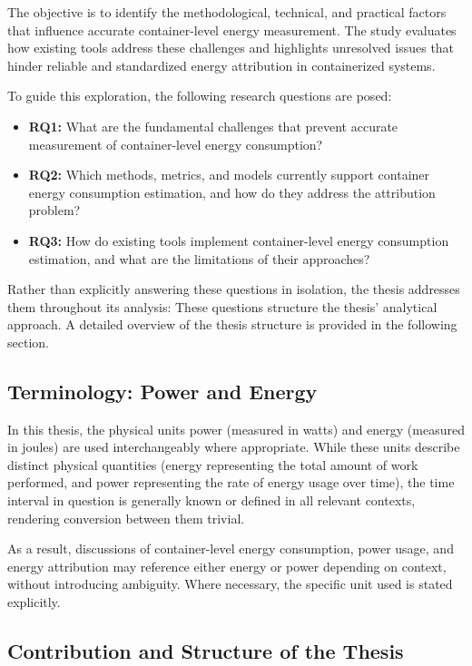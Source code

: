 The objective is to identify the methodological, technical, and practical factors that influence accurate container-level energy measurement. The study evaluates how existing tools address these challenges and highlights unresolved issues that hinder reliable and standardized energy attribution in containerized systems.

To guide this exploration, the following research questions are posed:

\begin{itemize}
\item \textbf{RQ1:} What are the fundamental challenges that prevent accurate measurement of container-level energy consumption?
\item \textbf{RQ2:} Which methods, metrics, and models currently support container energy consumption estimation, and how do they address the attribution problem?
\item \textbf{RQ3:} How do existing tools implement container-level energy consumption estimation, and what are the limitations of their approaches?
\end{itemize}

Rather than explicitly answering these questions in isolation, the thesis addresses them throughout its analysis: These questions structure the thesis’ analytical approach. A detailed overview of the thesis structure is provided in the following section.

\subsection{Terminology: Power and Energy}

In this thesis, the physical units power (measured in watts) and energy (measured in joules) are used interchangeably where appropriate. While these units describe distinct physical quantities (energy representing the total amount of work performed, and power representing the rate of energy usage over time), the time interval in question is generally known or defined in all relevant contexts, rendering conversion between them trivial.

As a result, discussions of container-level energy consumption, power usage, and energy attribution may reference either energy or power depending on context, without introducing ambiguity. Where necessary, the specific unit used is stated explicitly.

\subsection{Contribution and Structure of the Thesis}

